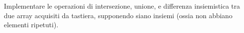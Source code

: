 \begin{Exercise}[label={ex:operazioni_set}]
  Implementare le operazioni di intersezione, unione, e differenza insiemistica tra due array acquisiti da tastiera, supponendo siano insiemi (ossia non abbiano elementi ripetuti).
\end{Exercise}

\begin{Answer}[ref={ex:operazioni_set}]
  
\end{Answer}
